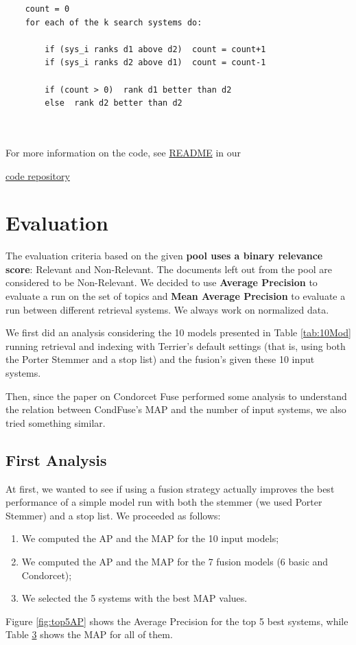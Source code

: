 \hfill
\begin{lstlisting}
	count = 0
	for each of the k search systems do:

		if (sys_i ranks d1 above d2)  count = count+1 
		if (sys_i ranks d2 above d1)  count = count-1 

		if (count > 0)  rank d1 better than d2
		else  rank d2 better than d2 
		
\end{lstlisting}
\hfill
\\
For more information on the code, see \href{https://github.com/annabonaldo/IRCondorcetFuse/blob/master/README.md}{README} in our {\href{https://github.com/annabonaldo/IRCondorcetFuse}{code repository }
    \section{Evaluation}

	The evaluation criteria based on the given \textbf{pool uses a binary relevance score}:
	Relevant and Non-Relevant.
	The documents left out from the pool are considered to be Non-Relevant.
	We decided to use \textbf{Average Precision} to evaluate a run on the set of topics and \textbf{Mean Average Precision} to evaluate a run between different retrieval systems. We always work on normalized data.
	
	We first did an analysis considering the 10 models presented in Table \ref{tab:10Mod} running retrieval and indexing with Terrier's default settings (that is, using both the Porter Stemmer and a stop list) and the fusion's given these 10 input systems.
	
	Then, since the paper on Condorcet Fuse performed some analysis to understand the relation between CondFuse's MAP and the number of input systems, we also tried something similar. 
	
	\subsection{First Analysis}
	At first, we wanted to see if using a fusion strategy actually improves the best performance of a simple model run with both the stemmer (we used Porter Stemmer) and a stop list.
	We proceeded as follows:
	\begin{enumerate}
		\item We computed the AP and the MAP for the 10 input models;
		\item We computed the AP and the MAP for the 7 fusion models (6 basic and Condorcet);
		\item We selected the 5 systems with the best MAP values.
	\end{enumerate}
	Figure \ref{fig:top5AP} shows the Average Precision for the top 5 best systems, while Table \hyperref[tab:17SysMAP]{3} shows the MAP for all of them.
	
}
